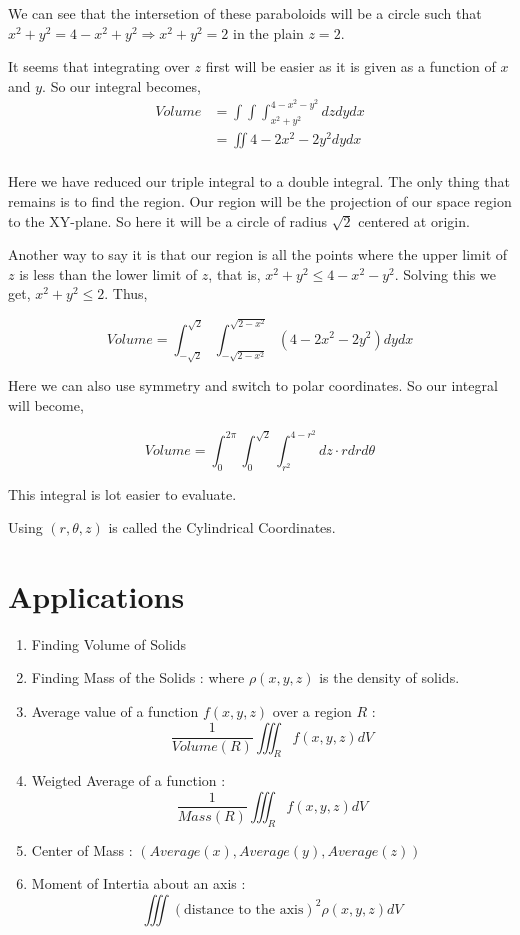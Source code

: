 We can see that the intersetion of these paraboloids will be a circle such that $x^2 + y^2 = 4 - x^2 + y^2 \Rightarrow x^2 + y^2 = 2$ in the plain $z = 2$.

It seems that integrating over $z$ first will be easier as it is given as a function of $x$ and $y$. So our integral becomes,
\begin{align*}
    Volume & = \int \int \int_{x^2+y^2}^{4-x^2-y^2} dz dy dx \\
        & = \iint 4 - 2x^2 -2y^2 dy dx \\
\end{align*}

Here we have reduced our triple integral to a double integral. 
The only thing that remains is to find the region. 
Our region will be the projection of our space region to the XY-plane. 
So here it will be a circle of radius $\sqrt{2}$ centered at origin.


Another way to say it is that our region is all the points where the upper limit of $z$ is less than the lower limit of $z$, that is, $x^2 + y^2 \leq 4 - x^2 - y^2$.
Solving this we get, $x^2 + y^2 \leq 2$. Thus,

$$
Volume = \int_{-\sqrt{2}}^{\sqrt{2}} \int_{-\sqrt{2-x^2}}^{\sqrt{2-x^2}} (4 - 2x^2 - 2y^2) dy dx
$$

Here we can also use symmetry and switch to polar coordinates. So our integral will become,

$$
Volume = \int_0^{2\pi} \int_0^{\sqrt{2}} \int_{r^2}^{4-r^2} dz \cdot r dr d\theta
$$

This integral is lot easier to evaluate.

Using $(r, \theta, z)$ is called the Cylindrical Coordinates.


\section{Applications}

\begin{enumerate}
    \item Finding Volume of Solids
    \item Finding Mass of the Solids :  where $\rho(x, y, z)$ is the density of solids.
    \item Average value of a function $f(x, y, z)$ over a region $R$ : $$ \frac{1}{Volume(R)} \iiint_R f(x, y, z) dV $$
    \item Weigted Average of a function : $$ \frac{1}{Mass(R)} \iiint_R f(x, y, z) dV $$ 
    \item Center of Mass : $(Average(x), Average(y), Average(z))$
    \item Moment of Intertia about an axis : $$ \iiint (\text{distance to the axis})^2 \rho(x, y, z) dV $$  
\end{enumerate}
